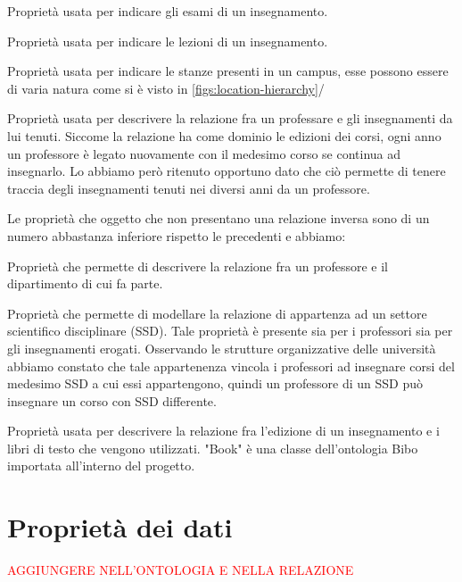 \begin{itemize}
    {Proprietà usata per indicare gli esami di un insegnamento.}
    
    {Proprietà usata per indicare le lezioni di un insegnamento.}

    {Proprietà usata per indicare le stanze presenti in un campus, esse possono essere di varia natura come si è visto in \cref{figs:location-hierarchy}/}

    {Proprietà usata per descrivere la relazione fra un professare e gli insegnamenti da lui tenuti. Siccome la relazione ha come dominio le edizioni dei corsi, ogni anno un professore è legato nuovamente con il medesimo corso se continua ad insegnarlo. Lo abbiamo però ritenuto opportuno dato che ciò permette di tenere traccia degli insegnamenti tenuti nei diversi anni da un professore.}

\end{itemize}

Le proprietà che oggetto che non presentano una relazione inversa sono di un numero abbastanza inferiore rispetto le precedenti e abbiamo:

\begin{itemize}
  {Proprietà che permette di descrivere la relazione fra un professore e il dipartimento di cui fa parte.}

  {Proprietà che permette di modellare la relazione di appartenza ad un settore scientifico disciplinare (SSD). Tale proprietà è presente sia per i professori sia per gli insegnamenti erogati. Osservando le strutture organizzative delle università abbiamo constato che tale appartenenza vincola i professori ad insegnare corsi del medesimo SSD a cui essi appartengono, quindi un professore di un SSD può insegnare un corso con SSD differente.}

  {Proprietà usata per descrivere la relazione fra l'edizione di un insegnamento e i libri di testo che vengono utilizzati. "Book" è una classe dell'ontologia Bibo importata all'interno del progetto.}
\end{itemize}

\section{Proprietà dei dati}

\textcolor{red}{AGGIUNGERE NELL'ONTOLOGIA E NELLA RELAZIONE}